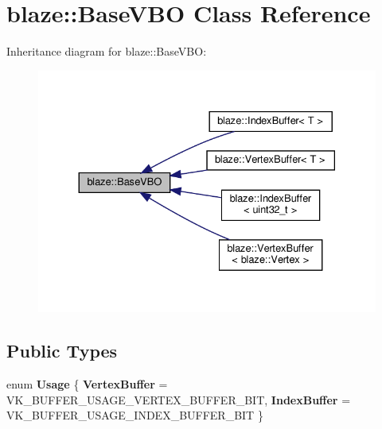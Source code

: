 \hypertarget{classblaze_1_1BaseVBO}{}\section{blaze\+:\+:Base\+V\+BO Class Reference}
\label{classblaze_1_1BaseVBO}


Inheritance diagram for blaze\+:\+:Base\+V\+BO\+:\nopagebreak
\begin{figure}[H]
\begin{center}
\leavevmode
\includegraphics[width=330pt]{classblaze_1_1BaseVBO__inherit__graph}
\end{center}
\end{figure}
\subsection*{Public Types}
\begin{DoxyCompactItemize}
\item 
\mbox{\label{classblaze_1_1BaseVBO_a0a207a857251b73334a9ee843b9c8da8}} 
enum {\bfseries Usage} \{ {\bfseries Vertex\+Buffer} = V\+K\+\_\+\+B\+U\+F\+F\+E\+R\+\_\+\+U\+S\+A\+G\+E\+\_\+\+V\+E\+R\+T\+E\+X\+\_\+\+B\+U\+F\+F\+E\+R\+\_\+\+B\+IT, 
{\bfseries Index\+Buffer} = V\+K\+\_\+\+B\+U\+F\+F\+E\+R\+\_\+\+U\+S\+A\+G\+E\+\_\+\+I\+N\+D\+E\+X\+\_\+\+B\+U\+F\+F\+E\+R\+\_\+\+B\+IT
 \}
\end{DoxyCompactItemize}
